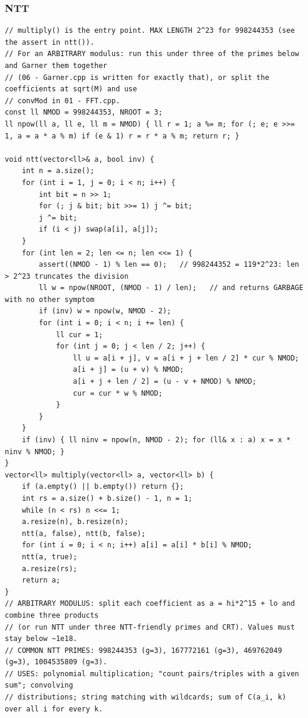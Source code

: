 \documentclass[9pt,a4paper,twocolumn]{extarticle}
\begin{document}
\subsubsection{NTT}
\nopagebreak
\begin{lstlisting}
// multiply() is the entry point. MAX LENGTH 2^23 for 998244353 (see the assert in ntt()).
// For an ARBITRARY modulus: run this under three of the primes below and Garner them together
// (06 - Garner.cpp is written for exactly that), or split the coefficients at sqrt(M) and use
// convMod in 01 - FFT.cpp.
const ll NMOD = 998244353, NROOT = 3;
ll npow(ll a, ll e, ll m = NMOD) { ll r = 1; a %= m; for (; e; e >>= 1, a = a * a % m) if (e & 1) r = r * a % m; return r; }

void ntt(vector<ll>& a, bool inv) {
    int n = a.size();
    for (int i = 1, j = 0; i < n; i++) {
        int bit = n >> 1;
        for (; j & bit; bit >>= 1) j ^= bit;
        j ^= bit;
        if (i < j) swap(a[i], a[j]);
    }
    for (int len = 2; len <= n; len <<= 1) {
        assert((NMOD - 1) % len == 0);   // 998244352 = 119*2^23: len > 2^23 truncates the division
        ll w = npow(NROOT, (NMOD - 1) / len);   // and returns GARBAGE with no other symptom
        if (inv) w = npow(w, NMOD - 2);
        for (int i = 0; i < n; i += len) {
            ll cur = 1;
            for (int j = 0; j < len / 2; j++) {
                ll u = a[i + j], v = a[i + j + len / 2] * cur % NMOD;
                a[i + j] = (u + v) % NMOD;
                a[i + j + len / 2] = (u - v + NMOD) % NMOD;
                cur = cur * w % NMOD;
            }
        }
    }
    if (inv) { ll ninv = npow(n, NMOD - 2); for (ll& x : a) x = x * ninv % NMOD; }
}
vector<ll> multiply(vector<ll> a, vector<ll> b) {
    if (a.empty() || b.empty()) return {};
    int rs = a.size() + b.size() - 1, n = 1;
    while (n < rs) n <<= 1;
    a.resize(n), b.resize(n);
    ntt(a, false), ntt(b, false);
    for (int i = 0; i < n; i++) a[i] = a[i] * b[i] % NMOD;
    ntt(a, true);
    a.resize(rs);
    return a;
}
// ARBITRARY MODULUS: split each coefficient as a = hi*2^15 + lo and combine three products
// (or run NTT under three NTT-friendly primes and CRT). Values must stay below ~1e18.
// COMMON NTT PRIMES: 998244353 (g=3), 167772161 (g=3), 469762049 (g=3), 1004535809 (g=3).
// USES: polynomial multiplication; "count pairs/triples with a given sum"; convolving
// distributions; string matching with wildcards; sum of C(a_i, k) over all i for every k.
\end{lstlisting}
\end{document}
